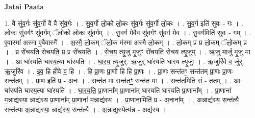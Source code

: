 \documentclass[17pt]{extarticle}
\begin{document}
\textbf{Jatai Paata} \newline

1. वै सु॑व॒र्गः सु॑व॒र्गो वै वै सु॑व॒र्गः । . सु॒व॒र्गो लो॒को लो॒कः सु॑व॒र्गः सु॑व॒र्गो लो॒कः । . सु॒व॒र्ग इति॑ सुवः - गः । . लो॒कः सु॑व॒र्गꣳ सु॑व॒र्गम् ॅलो॒को लो॒कः सु॑व॒र्गम् । . सु॒व॒र्ग मे॒वैव सु॑व॒र्गꣳ सु॑व॒र्ग मे॒व । . सु॒व॒र्गमिति॑ सुवः - गम् । . ए॒वास्मा॑ अस्मा ए॒वैवास्मै᳚ । . अ॒स्मै॒ लो॒कम् ॅलो॒क म॑स्मा अस्मै लो॒कम् । . लो॒कम् प्र प्र लो॒कम् ॅलो॒कम् प्र । . प्र रो॑चयति रोचयति॒ प्र प्र रो॑चयति । . रो॒च॒य॒ त्यृ॒जु मृ॒जुꣳ रो॑चयति रोचय त्यृ॒जुम् । . ऋ॒जु मार्जु मृ॒जु मा । . आ घा॑रयति घारय॒त्या घा॑रयति । . घा॒र॒य॒ त्यृ॒जुर्. ऋ॒जुर् घा॑रयति घारय त्यृ॒जुः । . ऋ॒जुरि॑वे व॒ र्जुर्. ऋ॒जुरि॑व । . इ॒व॒ हि हीवे॑ व॒ हि । . हि प्रा॒णः प्रा॒णो हि हि प्रा॒णः । . प्रा॒णः सन्त॑तꣳ॒॒ सन्त॑तम् प्रा॒णः प्रा॒णः सन्त॑तम् । . प्रा॒ण इति॑ प्र - अ॒नः । . सन्त॑त॒ मा सन्त॑तꣳ॒॒ सन्त॑त॒ मा । . सन्त॑त॒मिति॒ सं - त॒त॒म् । . आ घा॑रयति घारय॒त्या घा॑रयति । . घा॒र॒य॒ति॒ प्रा॒णाना᳚म् प्रा॒णाना᳚म् घारयति घारयति प्रा॒णाना᳚म् । . प्रा॒णाना॑ म॒न्नाद्य॑स्या॒ न्नाद्य॑स्य प्रा॒णाना᳚म् प्रा॒णाना॑ म॒न्नाद्य॑स्य । . प्रा॒णाना॒मिति॑ प्र - अ॒नाना᳚म् । . अ॒न्नाद्य॑स्य॒ सन्त॑त्यै॒ सन्त॑त्या अ॒न्नाद्य॑स्या॒ न्नाद्य॑स्य॒ सन्त॑त्यै । . अ॒न्नाद्य॒स्येत्य॑न्न - अद्य॑स्य । \newline
\end{document}
